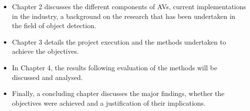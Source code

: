 \begin{itemize}

	\item Chapter 2 discusses the different components of AVs, current implementations in the industry, a background on the research that has been undertaken in the field of object detection.
	
	\item Chapter 3 details the project execution and the methods undertaken to achieve the objectives.  
	
	\item In Chapter 4, the results following evaluation of the methods will be discussed and analysed. 
	\item Finally, a concluding chapter discusses the major findings, whether the objectives were achieved and a justification of their implications. 
\end{itemize}


